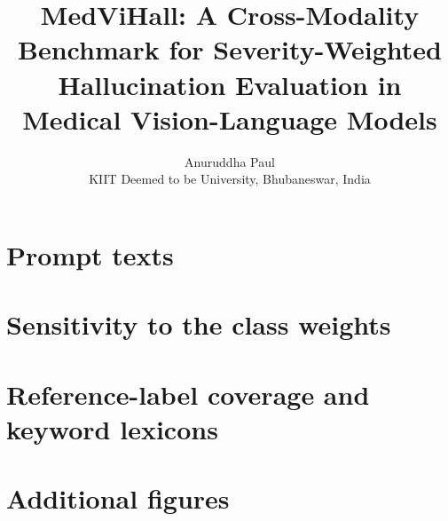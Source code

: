 \documentclass[11pt,a4paper]{article}
\title{MedViHall: A Cross-Modality Benchmark for Severity-Weighted Hallucination Evaluation in Medical Vision-Language Models}
\author{Anuruddha Paul\\ \small KIIT Deemed to be University, Bhubaneswar, India}
\date{}
\newif\ifshowtags
\newcommand{\TODO}[1]{\ifshowtags{\color{red}[#1]}\else\fi}
\begin{document}
\maketitle

\begin{abstract}
\TODO{Abstract to be written last, from audited results.}
\end{abstract}














\appendix
\section{Prompt texts}\label{app:prompts}
\TODO{Appendix to be written: system prompts and the query templates for the four modalities.}

\section{Sensitivity to the class weights}\label{app:weights}
\TODO{Appendix to be written: equal weights and random perturbation of up to 30 per cent.}

\section{Reference-label coverage and keyword lexicons}\label{app:coverage}
\TODO{Appendix to be written: coverage by modality and class (gt\_coverage\_notes.json) and the Layer 1 lexicons (stage2\_lexicons.py).}

\section{Additional figures}

\end{document}
